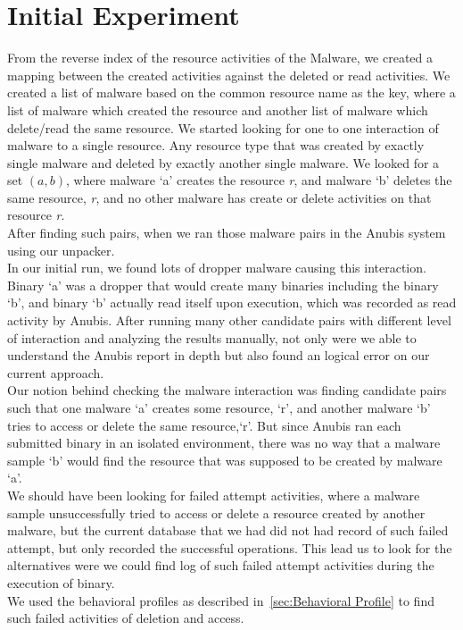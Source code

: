 \section{Initial Experiment}
\label{sec:Initial Experiment}
From the reverse index of the resource activities of the Malware, we created a mapping between the created activities against the deleted or read activities.
We created a list of malware based on the common resource name as the key, where a list of malware which created the resource and another list of malware which delete/read the same resource.
We started looking for one to one interaction of malware to a single resource. Any resource type that was created by exactly single malware and deleted by exactly another single malware.
We looked for a set $(a, b)$, where malware `a' creates the resource \emph{r}, and malware `b' deletes the same resource, \emph{r}, and no other malware has create or delete activities on that resource \emph{r}.\\
After finding such pairs, when we ran those malware pairs in the Anubis system using our unpacker.\\
In our initial run, we found lots of dropper malware causing this interaction. Binary `a' was a dropper that would create many binaries including the binary `b', and binary `b' actually read itself upon execution, which was recorded as read activity by Anubis.
After running many other candidate pairs with different level of interaction and analyzing the results manually, not only were we able to understand the Anubis report in depth but also found an logical error on our current approach.\\
Our notion behind checking the malware interaction was finding candidate pairs such that one malware `a' creates some resource, `r', and another malware `b' tries to access or delete the same resource,`r'.
But since Anubis ran each submitted binary in an isolated environment, there was no way that a malware sample `b' would find the resource that was supposed to be created by malware `a'.\\
We should have been looking for failed attempt activities, where a malware sample unsuccessfully tried to access or delete a resource created by another malware, but the current database that we had did not had record of such failed attempt, but only recorded the successful operations.
This lead us to look for the alternatives were we could find log of such failed attempt activities during the execution of binary.\\
We used the behavioral profiles as described in~\autoref{sec:Behavioral Profile} to find such failed activities of deletion and access.

